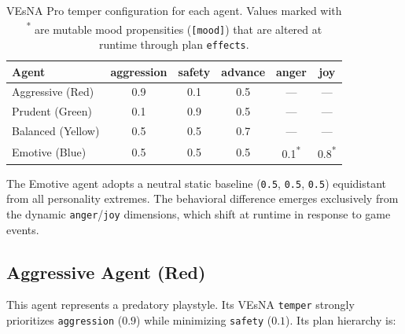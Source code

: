 \documentclass[12pt]{article}
\begin{document}
\begin{table}[htbp]
\centering
\begin{tabular}{|l|c|c|c|c|c|}
\hline
\textbf{Agent} & \textbf{aggression} & \textbf{safety} & \textbf{advance}
               & \textbf{anger} & \textbf{joy} \\
\hline
Aggressive (Red)  & 0.9 & 0.1 & 0.5 & ---                     & ---                     \\
Prudent (Green)   & 0.1 & 0.9 & 0.5 & ---                     & ---                     \\
Balanced (Yellow) & 0.5 & 0.5 & 0.7 & ---                     & ---                     \\
Emotive (Blue) & 0.5 & 0.5 & 0.5 & 0.1\textsuperscript{*}  & 0.8\textsuperscript{*}  \\
\hline
\end{tabular}
\caption{VEsNA Pro temper configuration for each agent. Values marked with
\textsuperscript{*} are mutable mood propensities (\texttt{[mood]}) that are
altered at runtime through plan \texttt{effects}.}
\label{tab:temper}
\end{table}

\noindent The Emotive agent adopts a neutral static baseline (\texttt{0.5}, \texttt{0.5}, \texttt{0.5})
equidistant from all personality extremes. The behavioral difference emerges exclusively from the dynamic
\texttt{anger}/\texttt{joy} dimensions, which shift at runtime in response to
game events.


\subsection{Aggressive Agent (Red)}
\label{subsec:agent_aggressive}
\noindent This agent represents a predatory playstyle. Its VEsNA \texttt{temper}
strongly prioritizes \texttt{aggression} ($0.9$) while minimizing \texttt{safety}
($0.1$). Its plan hierarchy is:
\end{document}
